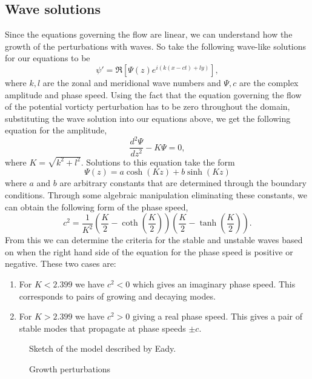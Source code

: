 \documentclass[a4paper,12pt]{article}
\begin{document}
\subsection{Wave solutions}
Since the equations governing the flow are linear, we can understand how the growth of the perturbations with waves. So take the following wave-like solutions for our equations to be
\begin{equation}
  \psi' = \Re\left[\Psi(z)e^{i(k(x-ct)+ly)}\right],
\end{equation}
where $k,l$ are the zonal and meridional wave numbers and $\Psi,c$ are the complex amplitude and phase speed. Using the fact that the equation governing the flow of the potential vorticty perturbation has to be zero throughout the domain, substituting the wave solution into our equations above, we get the following equation for the amplitude, 
\begin{equation}
  \frac{d^2\Psi}{dz^2} - K\Psi = 0,
\end{equation}
where $K=\sqrt{k^2+l^2}$. Solutions to this equation take the form 
\begin{equation}
  \Psi(z) = a\cosh(Kz)+b\sinh(Kz)
\end{equation}
where $a$ and $b$ are arbitrary constants that are determined through the boundary conditions. Through some algebraic manipulation eliminating these constants, we can obtain the following form of the phase speed,
\begin{equation}
  c^2 = \frac{1}{K^2}\left(\frac{K}{2}-\coth\left(\frac{K}{2}\right)\right)\left(\frac{K}{2}-\tanh\left(\frac{K}{2}\right)\right).
\end{equation}
From this we can determine the criteria for the stable and unstable waves based on when the right hand side of the equation for the phase speed is positive or negative. These two cases are:
\begin{enumerate}
  \item For $K<2.399$ we have $c^2<0$ which gives an imaginary phase speed. This corresponds to pairs of growing and decaying modes. 
  \item For $K>2.399$ we have $c^2>0$ giving a real phase speed. This gives a pair of stable modes that propagate at phase speeds $\pm c$. 
\end{enumerate}
\begin{figure}[hb]
  \centering
  
  \caption{Sketch of the model described by Eady.}
  \label{eadyexample}
\end{figure}
\begin{figure}[hb]
  \centering
  \caption{Growth perturbations} 
  \label{growthpicture}
\end{figure}
\end{document}

